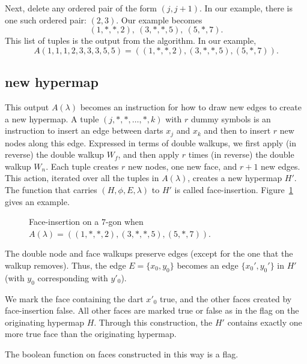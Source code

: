 Next,
delete any ordered pair of the form $(j,j+1)$. In our example, there
is one such ordered pair: $(2,3)$.  Our example becomes
  $$
  (1,*,*,2),\  (3,*,*,5),\ (5,*,7).
  $$
This list of tuples is the output from the algorithm.
In our example,
  $$A(1,1,1,2,3,3,3,5,5) = ((1,*,*,2),(3,*,*,5),(5,*,7)).$$



\subsection{new hypermap}

This output $A(\lambda)$
becomes an instruction for how to draw new edges to create a
new hypermap. A tuple $(j,*,*,\ldots,*,k)$ with $r$ dummy symbols
is an instruction to insert an edge between darts $x_j$ and $x_k$
and then to insert $r$ new nodes along this edge.
Expressed in terms of double walkups, we first apply (in
reverse) the double walkup $W_f$, and then apply $r$ times (in
reverse) the double walkup $W_n$.  Each tuple creates $r$ new
nodes, one new face, and $r+1$ new edges.  This action, 
iterated over all the tuples in $A(\lambda)$, creates a new hypermap
$H'$. 
The function that carries
$(H,\phi,E,\lambda)$ to $H'$ is called
face-insertion.  
Figure~\ref{fig:7darts} gives an example.


\begin{figure}[htb]
  \centering
  \caption{Face-insertion on a $7$-gon when
   $A(\lambda) = ((1,*,*,2),(3,*,*,5),(5,*,7))$.}
  \label{fig:7darts}
\end{figure}


The double node and face walkups preserve edges (except for
the one that the walkup removes).
Thus, the edge $E=\{x_0,y_0\}$
becomes an edge $\{x_0',y_0'\}$ in $H'$
(with $y_0$ corresponding with $y'_0$).

We mark the face containing the dart $x'_0$ true, and the other
faces created by face-insertion false.   All other faces are
marked true or false as in the flag on the originating hypermap $H$.  
Through this
construction, the $H'$ contains exactly one more true face
than the originating hypermap.

\begin{lemma} 
The boolean function on faces constructed in this way is a
flag.
\end{lemma}

